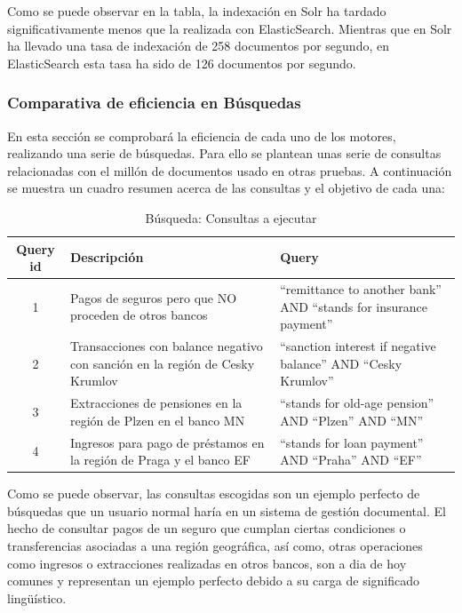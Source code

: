 \documentclass[runningheads,a4paper]{llncs}
\theoremstyle{break}
\newcommand{\rowstyle}[1]{\gdef\currentrowstyle{#1}%
  #1\ignorespaces
}
\begin{document}
Como se puede observar en la tabla, la indexación en Solr ha tardado significativamente menos que la realizada con ElasticSearch. Mientras que en Solr ha llevado una tasa de indexación de 258 documentos por segundo, en ElasticSearch esta tasa ha sido de 126 documentos por segundo.

\subsubsection{Comparativa de eficiencia en Búsquedas}
\textbf{}

En esta sección se comprobará la eficiencia de cada uno de los motores, realizando una serie de búsquedas. Para ello se plantean unas serie de consultas relacionadas con el millón de documentos usado en otras pruebas. A continuación se muestra un cuadro resumen acerca de las consultas y el objetivo de cada una:

\bgroup
\setlength{\tabcolsep}{10pt}
\def\arraystretch{1.8}
\begin{table}
\begin{tabular}{c|p{5cm}|p{5cm}}

\rowstyle{\bfseries} Query id & \rowstyle{\bfseries} Descripción & \rowstyle{\bfseries} Query \\ \hline

1 & Pagos de seguros pero que NO proceden de otros bancos & ``remittance to another bank'' AND ``stands for insurance payment'' \\
2 & Transacciones con balance negativo con sanción en la región de Cesky Krumlov & ``sanction interest if negative balance'' AND ``Cesky Krumlov'' \\
3 & Extracciones de pensiones en la región de Plzen en el banco MN & ``stands for old-age pension'' AND ``Plzen'' AND ``MN'' \\
4 & Ingresos para pago de préstamos en la región de Praga y el banco EF & ``stands for loan payment'' AND ``Praha'' AND ``EF'' \\ \hline
\end{tabular}
\vspace{1em}
\caption{Búsqueda: Consultas a ejecutar}
\end{table}
\egroup
\vspace{-1.5em}

Como se puede observar, las consultas escogidas son un ejemplo perfecto de búsquedas que un usuario normal haría en un sistema de gestión documental. El hecho de consultar pagos de un seguro que cumplan ciertas condiciones o transferencias asociadas a una región geográfica, así como, otras operaciones como ingresos o extracciones realizadas en otros bancos, son a dia de hoy comunes y representan un ejemplo perfecto debido a su carga de significado lingüístico. 
\end{document}
